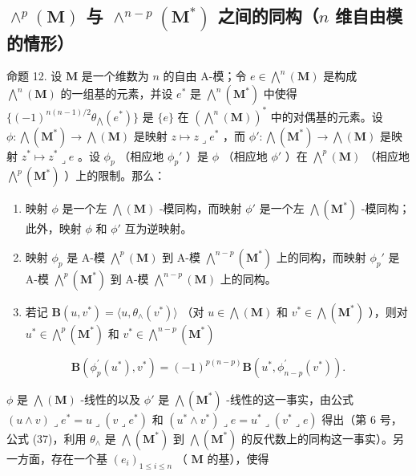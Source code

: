 \subsection{\texorpdfstring{\(\wedge^{p}(\mathbf{M})\) 与 \(\wedge^{n - p}(\mathbf{M}^{*})\) 之间的同构（\(n\) 维自由模的情形）}{\textbackslash wedge\^{}\{p\}(\textbackslash mathbf\{M\}) 与 \textbackslash wedge\^{}\{n - p\}(\textbackslash mathbf\{M\}\^{}\{*\}) 之间的同构（n 维自由模 M）}}

命题 12. 设 \(\mathbf{M}\) 是一个维数为 \(n\) 的自由 A-模；令 \(e \in \bigwedge^{n}(\mathbf{M})\) 是构成 \(\bigwedge^{n}(\mathbf{M})\) 的一组基的元素，并设 \(e^{*}\) 是 \(\bigwedge^{n}(\mathbf{M}^{*})\) 中使得 \(\{(-1)^{n(n-1)/2} \theta_{\bigwedge}(e^{*})\}\) 是 \(\{e\}\) 在 \((\bigwedge^{n}(\mathbf{M}))^{*}\) 中的对偶基的元素。设 \(\phi: \bigwedge(\mathbf{M}^{*}) \to \bigwedge(\mathbf{M})\) 是映射 \(z \mapsto z \lrcorner e^{*}\) ，而 \(\phi': \bigwedge(\mathbf{M}^{*}) \to \bigwedge(\mathbf{M})\) 是映射 \(z^{*} \mapsto z^{*} \lrcorner e\) 。设 \(\phi_{p}\) （相应地 \(\phi_{p}'\) ）是 \(\phi\) （相应地 \(\phi'\) ）在 \(\bigwedge^{p}(\mathbf{M})\) （相应地 \(\bigwedge^{p}(\mathbf{M}^{*})\) ）上的限制。那么：

\begin{enumerate}
\def\labelenumi{(\roman{enumi})}
\item
  映射 \(\phi\) 是一个左 \(\bigwedge (\mathbf{M})\) -模同构，而映射 \(\phi'\) 是一个左 \(\bigwedge (\mathbf{M}^*)\) -模同构；此外，映射 \(\phi\) 和 \(\phi'\) 互为逆映射。
\item
  映射 \(\phi_p\) 是 A-模 \(\bigwedge^p (\mathbf{M})\) 到 A-模 \(\bigwedge^{n - p}(\mathbf{M}^*)\) 上的同构，而映射 \(\phi_p'\) 是 A-模 \(\bigwedge^p (\mathbf{M}^*)\) 到 A-模 \(\bigwedge^{n - p}(\mathbf{M})\) 上的同构。
\item
  若记 \(\mathbf{B}(u,v^{*}) = \langle u,\theta_{\wedge}(v^{*})\rangle\) （对 \(u\in \bigwedge (\mathbf{M})\) 和 \(v^{*}\in \bigwedge (\mathbf{M}^{*})\) ），则对 \(u^{*}\in \bigwedge^{p}(\mathbf{M}^{*})\) 和 \(v^{*}\in \bigwedge^{n - p}(\mathbf{M}^{*})\)
\end{enumerate}

\[
\mathbf {B} \left(\phi_ {p} ^ {\prime} (u ^ {*}), v ^ {*}\right) = (- 1) ^ {p (n - p)} \mathbf {B} \left(u ^ {*}, \phi_ {n - p} ^ {\prime} (v ^ {*})\right).\tag{77}
\]

\(\phi\) 是 \(\bigwedge (\mathbf{M})\) -线性的以及 \(\phi'\) 是 \(\bigwedge (\mathbf{M}^*)\) -线性的这一事实，由公式 \((u \wedge v) \lrcorner e^* = u \lrcorner (v \lrcorner e^*)\) 和 \((u^* \wedge v^*) \lrcorner e = u^* \lrcorner (v^* \lrcorner e)\) 得出（第 6 号，公式 (37)，利用 \(\theta_{\wedge}\) 是 \(\bigwedge (\mathbf{M}^*)\) 到 \(\bigwedge (\mathbf{M}^*)\) 的反代数上的同构这一事实）。另一方面，存在一个基 \((e_i)_{1 \leq i \leq n}\) （ \(\mathbf{M}\) 的基），使得


